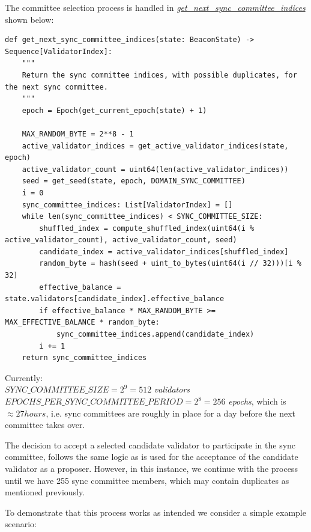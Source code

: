 The committee selection process is handled in \href{https://eth2book.info/capella/part3/helper/accessors/#def\_get\_next\_sync\_committee\_indices}{\textit{get\_next\_sync\_committee\_indices}} \cite{Edgington2023} shown below: 

\lstset{language=Python}

\begin{lstlisting}
def get_next_sync_committee_indices(state: BeaconState) -> Sequence[ValidatorIndex]:
    """
    Return the sync committee indices, with possible duplicates, for the next sync committee.
    """
    epoch = Epoch(get_current_epoch(state) + 1)

    MAX_RANDOM_BYTE = 2**8 - 1
    active_validator_indices = get_active_validator_indices(state, epoch)
    active_validator_count = uint64(len(active_validator_indices))
    seed = get_seed(state, epoch, DOMAIN_SYNC_COMMITTEE)
    i = 0
    sync_committee_indices: List[ValidatorIndex] = []
    while len(sync_committee_indices) < SYNC_COMMITTEE_SIZE:
        shuffled_index = compute_shuffled_index(uint64(i % active_validator_count), active_validator_count, seed)
        candidate_index = active_validator_indices[shuffled_index]
        random_byte = hash(seed + uint_to_bytes(uint64(i // 32)))[i % 32]
        effective_balance = state.validators[candidate_index].effective_balance
        if effective_balance * MAX_RANDOM_BYTE >= MAX_EFFECTIVE_BALANCE * random_byte:
            sync_committee_indices.append(candidate_index)
        i += 1
    return sync_committee_indices
  \end{lstlisting}  
  
  \noindent 
 Currently: \\
 \noindent   
$SYNC\_COMMITTEE\_SIZE = 2^9 = 512$ \textit{ validators}\\
$EPOCHS\_PER\_SYNC\_COMMITTEE\_PERIOD = 2^8 = 256$ \textit{ epochs}, which is $\approx 27 hours$, i.e. sync committees are roughly in place for a day before the next committee takes over.
 
The decision to accept a selected candidate validator  to participate in the sync committee, follows the same logic as is used for the acceptance of the candidate validator as a proposer. However, in this instance, we continue with the process until we have 255 sync committee members, which may contain duplicates as mentioned previously.
 
To demonstrate that this process works as intended we consider a simple example scenario:

